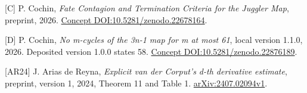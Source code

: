 \documentclass[11pt,a4paper]{article}
\begin{document}
{[}C{]} P. Cochin, \emph{Fate Contagion and Termination Criteria for the
Juggler Map}, preprint, 2026.
\href{https://doi.org/10.5281/zenodo.22678164}{Concept
DOI:10.5281/zenodo.22678164}.

{[}D{]} P. Cochin, \emph{No m-cycles of the 3n-1 map for m at most 61},
local version 1.1.0, 2026. Deposited version 1.0.0 states 58.
\href{https://doi.org/10.5281/zenodo.22876189}{Concept
DOI:10.5281/zenodo.22876189}.

{[}AR24{]} J. Arias de Reyna, \emph{Explicit van der Corput's d-th
derivative estimate}, preprint, version 1, 2024, Theorem 11 and Table 1.
\href{https://arxiv.org/abs/2407.02094v1}{arXiv:2407.02094v1}.

\endgroup
\end{document}
